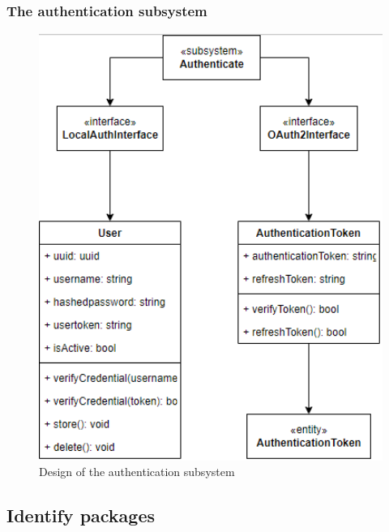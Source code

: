 \documentclass[a4paper]{article}
\begin{document}
\subsubsection{The authentication subsystem}
\begin{figure}[H]
  \centering
  \includegraphics[width=1.0\textwidth]{authentication_subsystem.png}
  \caption{Design of the authentication subsystem}
  \label{fig:fig33}
\end{figure}

\subsection{Identify packages}
\end{document}
